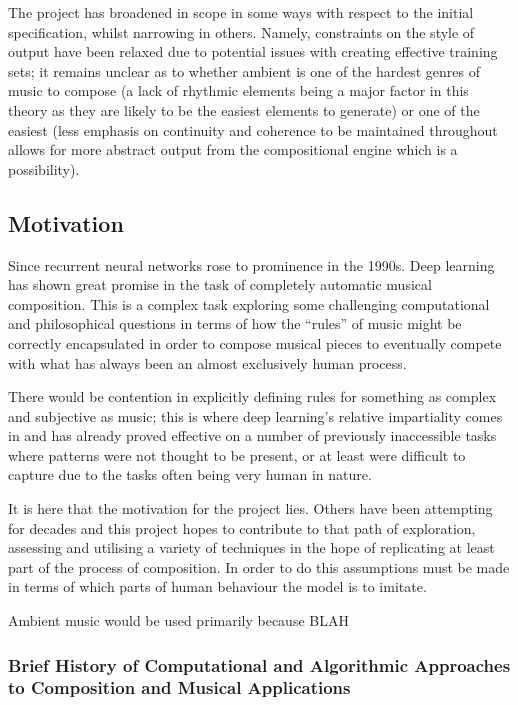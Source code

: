 \documentclass[12pt,]{article}
\begin{document}
The project has broadened in scope in some ways with respect to the
initial specification, whilst narrowing in others. Namely, constraints
on the style of output have been relaxed due to potential issues with
creating effective training sets; it remains unclear as to whether
ambient is one of the hardest genres of music to compose (a lack of
rhythmic elements being a major factor in this theory as they are likely
to be the easiest elements to generate) or one of the easiest (less
emphasis on continuity and coherence to be maintained throughout allows
for more abstract output from the compositional engine which is a
possibility).

\hypertarget{motivation}{%
\subsection{Motivation}\label{motivation}}

Since recurrent neural networks rose to prominence in the 1990s. Deep
learning has shown great promise in the task of completely automatic
musical composition. This is a complex task exploring some challenging
computational and philosophical questions in terms of how the ``rules''
of music might be correctly encapsulated in order to compose musical
pieces to eventually compete with what has always been an almost
exclusively human process.

There would be contention in explicitly defining rules for something as
complex and subjective as music; this is where deep learning's relative
impartiality comes in and has already proved effective on a number of
previously inaccessible tasks where patterns were not thought to be
present, or at least were difficult to capture due to the tasks often
being very human in nature.

It is here that the motivation for the project lies. Others have been
attempting for decades and this project hopes to contribute to that path
of exploration, assessing and utilising a variety of techniques in the
hope of replicating at least part of the process of composition. In
order to do this assumptions must be made in terms of which parts of
human behaviour the model is to imitate.

Ambient music would be used primarily because BLAH

\hypertarget{brief-history-of-computational-and-algorithmic-approaches-to-composition-and-musical-applications}{%
\subsubsection{Brief History of Computational and Algorithmic Approaches
to Composition and Musical
Applications}\label{brief-history-of-computational-and-algorithmic-approaches-to-composition-and-musical-applications}}
\end{document}
